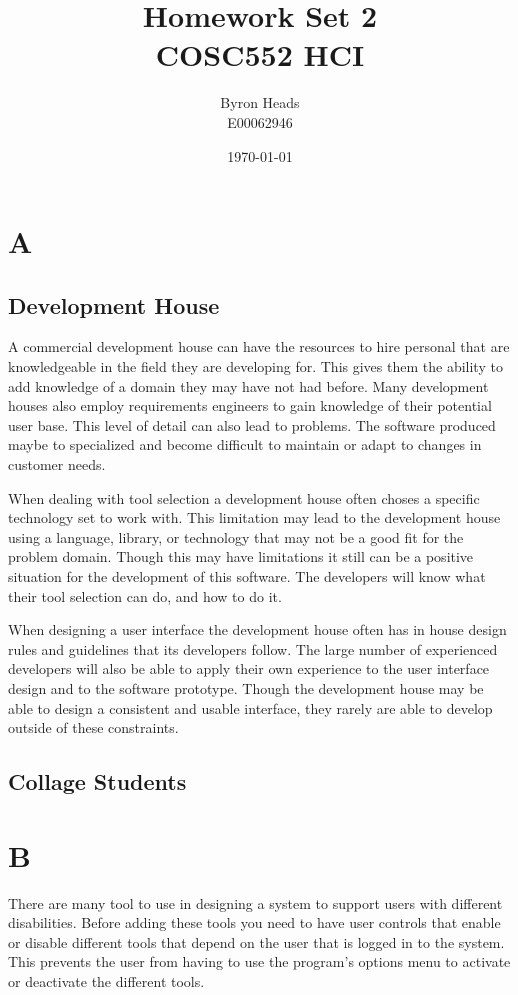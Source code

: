 \documentclass[12pt]{article}
\title{Homework Set 2 \\
    COSC552 HCI}
\author{ Byron Heads \\
    E00062946 }
\date{\today}
\begin{document}
\maketitle

\section*{A}

\subsection*{Development House}
A commercial development house can have the resources to hire personal
that are knowledgeable in the field they are developing for.  This gives
them the ability to add knowledge of a domain they may have not had
before.  Many development houses also employ requirements engineers to
gain knowledge of their potential user base.  This level of detail can
also lead to problems.  The software produced maybe to specialized and
become difficult to maintain or adapt to changes in customer needs.

When dealing with tool selection a development house often choses a 
specific technology set to work with.  This limitation may lead to the
development house using a language, library, or technology that may not
be a good fit for the problem domain.  Though this may have limitations
it still can be a positive situation for the development of this software.
The developers will know what their tool selection can do, and how to
do it.

When designing a user interface the development house often has in house
design rules and guidelines that its developers follow.  The large number
of experienced developers will also be able to apply their own experience 
to the user interface design and to the software prototype.  Though the 
development house may be able to design a consistent and usable interface,
they rarely are able to develop outside of these constraints.

\subsection*{Collage Students}

\section*{B}

There are many tool to use in designing a system to support users with 
different disabilities.  Before adding these tools you need to have user
controls that enable or disable different tools that depend on the user
that is logged in to the system.  This prevents the user from having to
use the program's options menu to activate or deactivate the different
tools.
\end{document}
